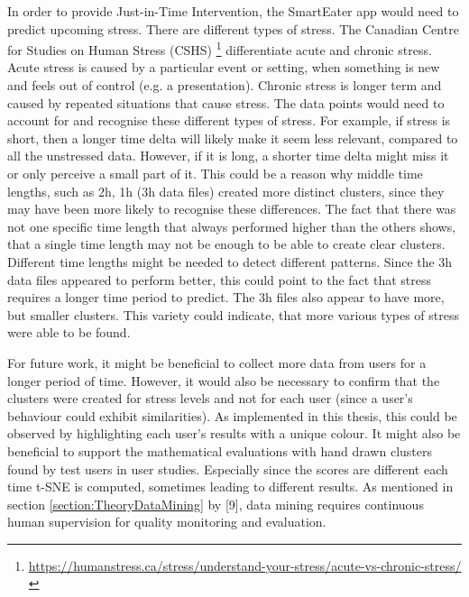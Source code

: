 In order to provide Just-in-Time Intervention, the SmartEater app would need to predict upcoming stress. There are different types of stress. The Canadian Centre for Studies on Human Stress (CSHS) \footnote{\url{https://humanstress.ca/stress/understand-your-stress/acute-vs-chronic-stress/}} differentiate acute and chronic stress. Acute stress is caused by a particular event or setting, when something is new and feels out of control (e.g. a presentation). Chronic stress is longer term and caused by repeated situations that cause stress. The data points would need to account for and recognise these different types of stress. For example, if stress is short, then a longer time delta will likely make it seem less relevant, compared to all the unstressed data. However, if it is long, a shorter time delta might miss it or only perceive a small part of it. This could be a reason why middle time lengths, such as 2h, 1h (3h data files) created more distinct clusters, since they may have been more likely to recognise these differences. The fact that there was not one specific time length that always performed higher than the others shows, that a single time length may not be enough to be able to create clear clusters. Different time lengths might be needed to detect different patterns. Since the 3h data files appeared to perform better, this could point to the fact that stress requires a longer time period to predict. The 3h files also appear to have more, but smaller clusters. This variety could indicate, that more various types of stress were able to be found.

For future work, it might be beneficial to collect more data from users for a longer period of time. However, it would also be necessary to confirm that the clusters were created for stress levels and not for each user (since a user's behaviour could exhibit similarities). As implemented in this thesis, this could be observed by highlighting each user's results with a unique colour. It might also be beneficial to support the mathematical evaluations with hand drawn clusters found by test users in user studies. Especially since the scores are different each time t-SNE is computed, sometimes leading to different results. As mentioned in section \ref{section:TheoryDataMining} by \textcite{DataMiningAndPredictiveAnalytics}[9], data mining requires continuous human supervision for quality monitoring and evaluation.

